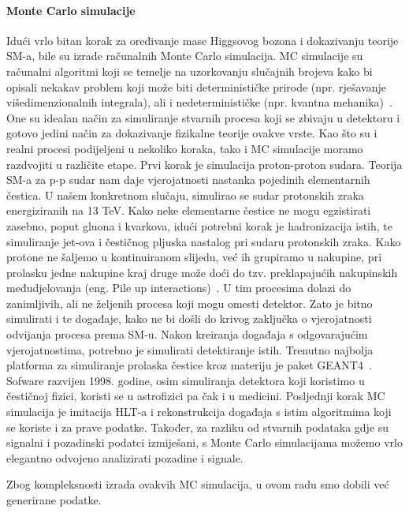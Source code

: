 \documentclass[12pt,a4paper,oneside]{article}
\begin{document}
\begin{linenumbers}
		\paragraph{Monte Carlo simulacije\newline}
		Idući vrlo bitan korak za oređivanje mase Higgsovog bozona i dokazivanju teorije SM-a, bile su izrade računalnih Monte Carlo simulacija. MC simulacije su računalni algoritmi koji se temelje na uzorkovanju slučajnih brojeva kako bi opisali nekakav problem koji može biti determinističke prirode (npr. rješavanje višedimenzionalnih integrala), ali i nedeterminističke (npr. kvantna mehanika)~\cite{mc-simulacije}. One su idealan način za simuliranje  stvarnih procesa koji se zbivaju u detektoru i gotovo jedini način za dokazivanje fizikalne teorije ovakve vrste. 
		Kao što su i realni procesi podijeljeni u nekoliko koraka, tako i MC simulacije moramo razdvojiti u različite etape.
		Prvi korak je simulacija proton-proton sudara. Teorija SM-a za p-p sudar nam daje vjerojatnosti nastanka pojedinih elementarnih čestica. U našem konkretnom slučaju, simulirao se sudar protonskih zraka energiziranih na 13 TeV. Kako neke elementarne čestice ne mogu egzistirati zasebno, poput gluona i kvarkova, idući potrebni korak je hadronizacija istih, te simuliranje jet-ova i čestičnog pljuska nastalog pri sudaru protonskih zraka. Kako protone ne šaljemo u kontinuiranom slijedu, već ih grupiramo u nakupine, pri prolasku jedne nakupine kraj druge može doći do tzv. preklapajućih nakupinskih međudjelovanja (eng. Pile up interactions)~\cite{pileup}. U tim procesima dolazi do zanimljivih, ali ne željenih procesa koji mogu omesti detektor. Zato je bitno simulirati i te događaje, kako ne bi došli do krivog zaključka o vjerojatnosti odvijanja procesa prema SM-u. 
		Nakon kreiranja događaja s odgovarajućim vjerojatnostima, potrebno je simulirati detektiranje istih. Trenutno najbolja platforma za simuliranje prolaska čestice kroz materiju je paket GEANT4~\cite{geant4}. Sofware razvijen 1998. godine, osim simuliranja detektora koji koristimo u čestičnoj fizici, koristi se u astrofizici pa čak i u medicini. 
		Posljednji korak MC simulacija je imitacija HLT-a i rekonstrukcija događaja s istim algoritmima koji se koriste i za prave podatke.
		Također, za razliku od stvarnih podataka gdje su signalni i pozadinski podatci izmiješani, s Monte Carlo simulacijama možemo vrlo elegantno odvojeno analizirati pozadine i signale.
		
		Zbog kompleksnosti izrada ovakvih MC simulacija, u ovom radu smo dobili već generirane podatke.
		

\end{linenumbers}
\end{document}
